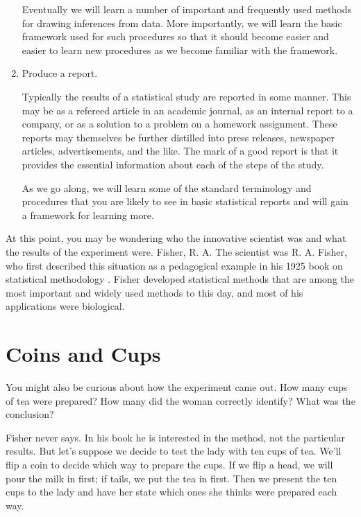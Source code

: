 \documentclass[]{book}
\begin{document}
\begin{enumerate}
  Eventually we will
  learn a number of important and frequently used methods for
  drawing inferences from data. More importantly, we will learn
  the basic framework used for such procedures so that it should
  become easier and easier to learn new procedures as we become
  familiar with the framework.
\item
  Produce a report.

  Typically the results of a statistical study are reported in
  some manner. This may be as a refereed article in an academic
  journal, as an internal report to a company, or as a solution
  to a problem on a homework assignment. These reports may themselves
  be further distilled into press releases, newspaper articles,
  advertisements, and the like. The mark of a good report
  is that it provides the essential information about each
  of the steps of the study.

  As we go along, we will learn some of the standard terminology and
  procedures that you are likely to see in basic statistical reports and
  will gain a framework for learning more.\\
\end{enumerate}

At this point, you may be wondering who the innovative scientist was and what the results of the experiment were. Fisher, R. A.
The scientist was R. A. Fisher, who first described this situation as a pedagogical example in his 1925 book on statistical methodology \citet{Fisher:1925:Methods}. Fisher developed statistical methods that are among the most important and widely used methods to this day, and most of his applications were biological.

\hypertarget{coins-and-cups}{%
\section{Coins and Cups}\label{coins-and-cups}}

You might also be curious about how the experiment came out. How many cups of tea were prepared? How many did the woman correctly identify? What was the conclusion?

Fisher never says. In his book he is interested in the method, not the particular results. But let's suppose we decide to test the lady with ten cups of tea. We'll flip a coin to decide which way to prepare the cups. If we flip a head, we will pour the milk in first; if tails, we put the tea in first. Then we present the ten cups to the lady and have her state which ones she thinks were prepared each way.
\end{document}
